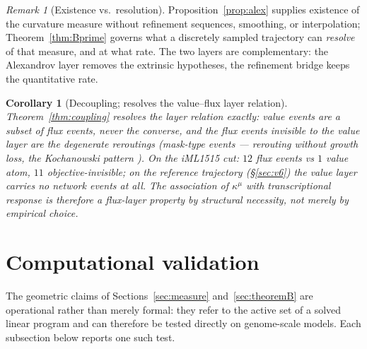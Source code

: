 \documentclass[11pt,a4paper]{article}
\theoremstyle{plain}
\newtheorem{corollary}[theorem]{Corollary}
\theoremstyle{definition}
\theoremstyle{remark}
\newtheorem{remark}[theorem]{Remark}
\newcommand{\kmu}{\kappa^{\mu}}
\begin{document}
\begin{remark}[Existence vs.\ resolution]
Proposition~\ref{prop:alex} supplies existence of the curvature measure
without refinement sequences, smoothing, or interpolation; Theorem~\ref{thm:Bprime} governs what a discretely sampled trajectory can \emph{resolve} of that
measure, and at what rate. The two layers are complementary: the
Alexandrov layer removes the extrinsic hypotheses, the refinement
bridge keeps the quantitative rate.
\end{remark}

\begin{corollary}[Decoupling; resolves the value--flux layer
relation]\label{cor:valueflux}
Theorem~\ref{thm:coupling} resolves the layer relation exactly: value
events are a subset of flux events, never the converse, and the flux
events invisible to the value layer are the degenerate reroutings
(mask-type events --- rerouting without growth loss, the Kochanowski pattern \citep{kochanowski2013}). On the iML1515 cut: $12$ flux events vs $1$ value atom, $11$ objective-invisible; on the reference trajectory (\S\ref{sec:v6}) the
value layer carries no network events at all. The association of
$\kmu$ with transcriptional response is therefore a flux-layer
property by structural necessity, not merely by empirical choice.
\end{corollary}

\section{Computational validation}\label{sec:computational}

The geometric claims of Sections~\ref{sec:measure}
and~\ref{sec:theoremB} are operational rather than merely formal: they
refer to the active set of a solved linear program and can therefore
be tested directly on genome-scale models. Each subsection below
reports one such test.
\end{document}
